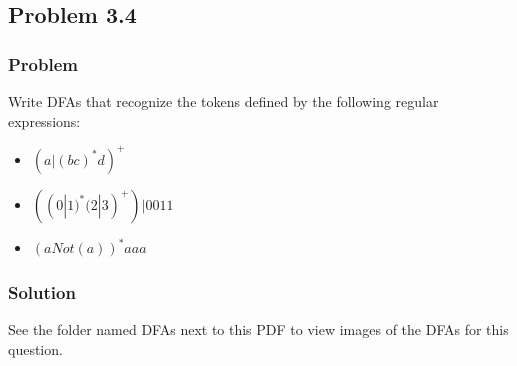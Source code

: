 \documentclass[letterpaper, 10pt,DIV=13]{scrartcl}
\numberwithin{equation}{section} %
\numberwithin{figure}{section} %
\numberwithin{table}{section} %
\begin{document}
\subsection{Problem 3.4}
\subsubsection{Problem}
Write DFAs that recognize the tokens defined by the following regular expressions:
\begin{itemize}
    \item $(a | (bc)^* d)^+$
    \item $((0 | 1) ^* (2 | 3)^+ ) | 0011$
    \item $(a Not(a))^* aaa$
\end{itemize}

\subsubsection{Solution}
See the folder named DFAs next to this PDF to view images of the DFAs for this question.

 

\end{document}
